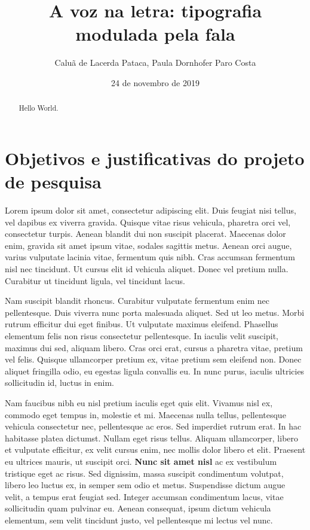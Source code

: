 \documentclass{tufte-handout}
\title{A voz na letra: tipografia modulada pela fala}
\author{Caluã de Lacerda Pataca, Paula Dornhofer Paro Costa}
\date{24 de novembro de 2019}  %
\begin{document}
\maketitle%

\begin{abstract}
\noindent Hello World.
\end{abstract}


\section{Objetivos e justificativas do projeto de pesquisa}\label{sec:objetivos}



Lorem ipsum dolor sit amet, consectetur adipiscing elit. Duis feugiat nisi tellus, vel dapibus ex viverra gravida. Quisque vitae risus vehicula, pharetra orci vel, consectetur turpis. Aenean blandit dui non suscipit placerat. Maecenas dolor enim, gravida sit amet ipsum vitae, sodales sagittis metus. Aenean orci augue, varius vulputate lacinia vitae, fermentum quis nibh. Cras accumsan fermentum nisl nec tincidunt. Ut cursus elit id vehicula aliquet. Donec vel pretium nulla. Curabitur ut tincidunt ligula, vel tincidunt lacus.

Nam suscipit blandit rhoncus. Curabitur vulputate fermentum enim nec pellentesque. Duis viverra nunc porta malesuada aliquet. Sed ut leo metus. Morbi rutrum efficitur dui eget finibus. Ut vulputate maximus eleifend. Phasellus elementum felis non risus consectetur pellentesque. In iaculis velit suscipit, maximus dui sed, aliquam libero. Cras orci erat, cursus a pharetra vitae, pretium vel felis. Quisque ullamcorper pretium ex, vitae pretium sem eleifend non. Donec aliquet fringilla odio, eu egestas ligula convallis eu. In nunc purus, iaculis ultricies sollicitudin id, luctus in enim.

Nam faucibus nibh eu nisl pretium iaculis eget quis elit. Vivamus nisl ex, commodo eget tempus in, molestie et mi. Maecenas nulla tellus, pellentesque vehicula consectetur nec, pellentesque ac eros. Sed imperdiet rutrum erat. In hac habitasse platea dictumst. Nullam eget risus tellus. Aliquam ullamcorper, libero et vulputate efficitur, ex velit cursus enim, nec mollis dolor libero et elit. Praesent eu ultrices mauris, ut suscipit orci. \textbf{Nunc sit amet nisl} ac ex vestibulum tristique eget ac risus. Sed dignissim, massa suscipit condimentum volutpat, libero leo luctus ex, in semper sem odio et metus. Suspendisse dictum augue velit, a tempus erat feugiat sed. Integer accumsan condimentum lacus, vitae sollicitudin quam pulvinar eu. Aenean consequat, ipsum dictum vehicula elementum, sem velit tincidunt justo, vel pellentesque mi lectus vel nunc.
\end{document}

